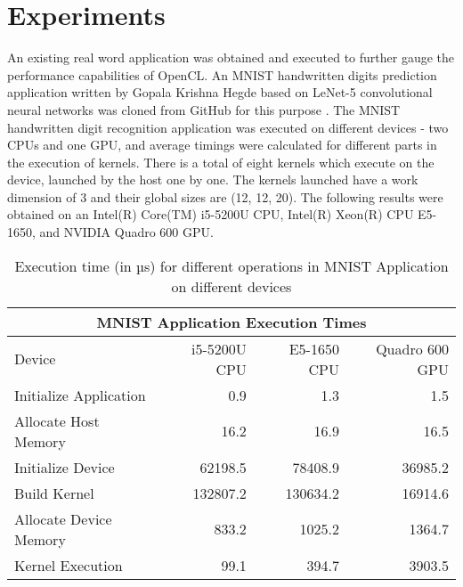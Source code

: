 \section{Experiments}
\label{sect5_3}
An existing real word application was obtained and executed to further gauge the performance capabilities of OpenCL. An MNIST handwritten digits prediction application written by Gopala Krishna Hegde based on LeNet-5 convolutional neural networks was cloned from GitHub for this purpose \cite{cnn_mnist_papaa}.\newline\newline
The MNIST handwritten digit recognition application was executed on different devices - two CPUs and one GPU, and average timings were calculated for different parts in the execution of kernels. There is a total of eight kernels which execute on the device, launched by the host one by one. The kernels launched have a work dimension of 3 and their global sizes are (12, 12, 20). \newline\newline
The following results were obtained on an Intel(R) Core(TM) i5-5200U CPU, Intel(R) Xeon(R) CPU E5-1650, and NVIDIA Quadro 600 GPU. \newline

\begin{table}[h!]
\centering
 \caption{Execution time (in µs) for different operations in MNIST Application on different devices}
 \begin{tabular}{ | l | r | r | r |  }
 \hline
 \multicolumn{4}{|c|}{MNIST Application Execution Times} \\
 \hline
  Device & i5-5200U CPU & E5-1650 CPU& Quadro 600 GPU\\
 \hline
 Initialize Application & 0.9 & 1.3 & 1.5 \\
 Allocate Host Memory & 16.2 & 16.9 & 16.5\\
 Initialize Device & 62198.5 & 78408.9 & 36985.2 \\
 Build Kernel & 132807.2 & 130634.2 & 16914.6 \\
 Allocate Device Memory & 833.2 & 1025.2 & 1364.7 \\
 Kernel Execution & 99.1 & 394.7 & 3903.5 \\
 \hline
 \end{tabular}
 \label{table:mnist}
\end{table}

